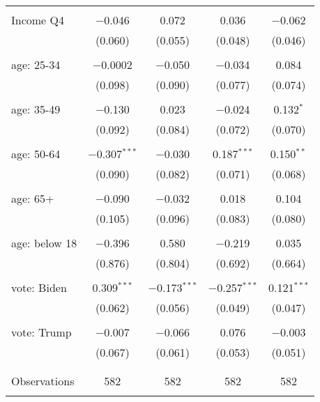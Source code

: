 \begin{tabular}{@{\extracolsep{5pt}}lcccc}
  & & & & \\ 
 Income Q4 & $-$0.046 & 0.072 & 0.036 & $-$0.062 \\ 
  & (0.060) & (0.055) & (0.048) & (0.046) \\ 
  & & & & \\ 
 age: 25-34 & $-$0.0002 & $-$0.050 & $-$0.034 & 0.084 \\ 
  & (0.098) & (0.090) & (0.077) & (0.074) \\ 
  & & & & \\ 
 age: 35-49 & $-$0.130 & 0.023 & $-$0.024 & 0.132$^{*}$ \\ 
  & (0.092) & (0.084) & (0.072) & (0.070) \\ 
  & & & & \\ 
 age: 50-64 & $-$0.307$^{***}$ & $-$0.030 & 0.187$^{***}$ & 0.150$^{**}$ \\ 
  & (0.090) & (0.082) & (0.071) & (0.068) \\ 
  & & & & \\ 
 age: 65+ & $-$0.090 & $-$0.032 & 0.018 & 0.104 \\ 
  & (0.105) & (0.096) & (0.083) & (0.080) \\ 
  & & & & \\ 
 age: below 18 & $-$0.396 & 0.580 & $-$0.219 & 0.035 \\ 
  & (0.876) & (0.804) & (0.692) & (0.664) \\ 
  & & & & \\ 
 vote: Biden & 0.309$^{***}$ & $-$0.173$^{***}$ & $-$0.257$^{***}$ & 0.121$^{***}$ \\ 
  & (0.062) & (0.056) & (0.049) & (0.047) \\ 
  & & & & \\ 
 vote: Trump & $-$0.007 & $-$0.066 & 0.076 & $-$0.003 \\ 
  & (0.067) & (0.061) & (0.053) & (0.051) \\ 
  & & & & \\ 
\hline \\[-1.8ex] 

Observations & 582 & 582 & 582 & 582 \\ 
\hline 
\hline \\[-1.8ex] 
\end{tabular} 